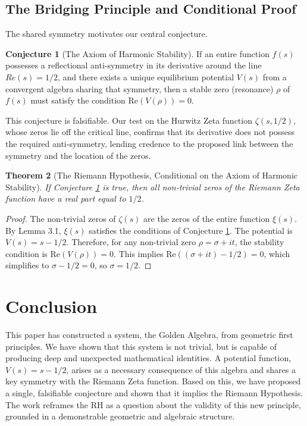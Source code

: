 \documentclass{article}
\theoremstyle{plain}
\newtheorem{theorem}{Theorem}[section]
\theoremstyle{definition}
\newtheorem{conjecture}[theorem]{Conjecture}
\begin{document}
\subsection{The Bridging Principle and Conditional Proof}
The shared symmetry motivates our central conjecture.
\begin{conjecture}[The Axiom of Harmonic Stability]
\label{conj:stability}
If an entire function $f(s)$ possesses a reflectional anti-symmetry in its derivative around the line $Re(s)=1/2$, and there exists a unique equilibrium potential $V(s)$ from a convergent algebra sharing that symmetry, then a stable zero (resonance) $\rho$ of $f(s)$ must satisfy the condition $\mathrm{Re}(V(\rho))=0$.
\end{conjecture}

This conjecture is falsifiable. Our test on the Hurwitz Zeta function $\zeta(s, 1/2)$, whose zeros lie off the critical line, confirms that its derivative does not possess the required anti-symmetry, lending credence to the proposed link between the symmetry and the location of the zeros.

\begin{theorem}[The Riemann Hypothesis, Conditional on the Axiom of Harmonic Stability]
If Conjecture \ref{conj:stability} is true, then all non-trivial zeros of the Riemann Zeta function have a real part equal to $1/2$.
\end{theorem}
\begin{proof}
The non-trivial zeros of $\zeta(s)$ are the zeros of the entire function $\xi(s)$. By Lemma 3.1, $\xi(s)$ satisfies the conditions of Conjecture \ref{conj:stability}. The potential is $V(s) = s - 1/2$. Therefore, for any non-trivial zero $\rho = \sigma+it$, the stability condition is $\text{Re}(V(\rho))=0$. This implies $\text{Re}((\sigma+it) - 1/2) = 0$, which simplifies to $\sigma - 1/2 = 0$, so $\sigma = 1/2$.
\end{proof}

\section{Conclusion}
This paper has constructed a system, the Golden Algebra, from geometric first principles. We have shown that this system is not trivial, but is capable of producing deep and unexpected mathematical identities. A potential function, $V(s) = s - 1/2$, arises as a necessary consequence of this algebra and shares a key symmetry with the Riemann Zeta function. Based on this, we have proposed a single, falsifiable conjecture and shown that it implies the Riemann Hypothesis. The work reframes the RH as a question about the validity of this new principle, grounded in a demonstrable geometric and algebraic structure.
\end{document}
